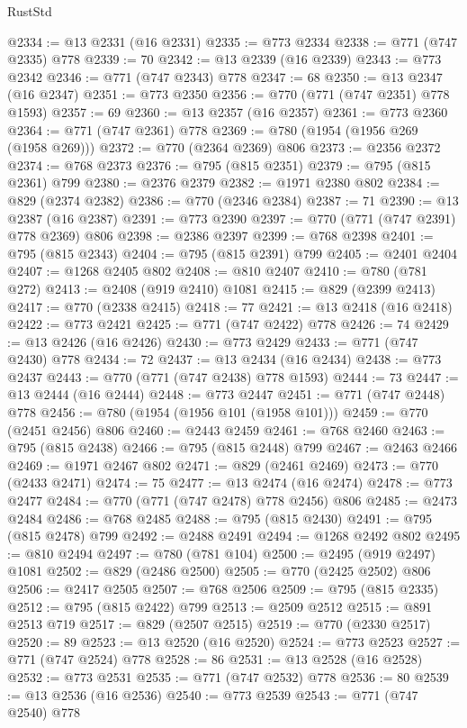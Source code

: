 \begin{lexlean}{RustStd}
\begin{coremodule}
@2334 := @13 @2331 (@16 @2331)
@2335 := @773 @2334
@2338 := @771 (@747 @2335) @778
@2339 := 70
@2342 := @13 @2339 (@16 @2339)
@2343 := @773 @2342
@2346 := @771 (@747 @2343) @778
@2347 := 68
@2350 := @13 @2347 (@16 @2347)
@2351 := @773 @2350
@2356 := @770 (@771 (@747 @2351) @778 @1593)
@2357 := 69
@2360 := @13 @2357 (@16 @2357)
@2361 := @773 @2360
@2364 := @771 (@747 @2361) @778
@2369 := @780 (@1954 (@1956 @269 (@1958 @269)))
@2372 := @770 (@2364 @2369) @806
@2373 := @2356 @2372
@2374 := @768 @2373
@2376 := @795 (@815 @2351)
@2379 := @795 (@815 @2361) @799
@2380 := @2376 @2379
@2382 := @1971 @2380 @802
@2384 := @829 (@2374 @2382)
@2386 := @770 (@2346 @2384)
@2387 := 71
@2390 := @13 @2387 (@16 @2387)
@2391 := @773 @2390
@2397 := @770 (@771 (@747 @2391) @778 @2369) @806
@2398 := @2386 @2397
@2399 := @768 @2398
@2401 := @795 (@815 @2343)
@2404 := @795 (@815 @2391) @799
@2405 := @2401 @2404
@2407 := @1268 @2405 @802
@2408 := @810 @2407
@2410 := @780 (@781 @272)
@2413 := @2408 (@919 @2410) @1081
@2415 := @829 (@2399 @2413)
@2417 := @770 (@2338 @2415)
@2418 := 77
@2421 := @13 @2418 (@16 @2418)
@2422 := @773 @2421
@2425 := @771 (@747 @2422) @778
@2426 := 74
@2429 := @13 @2426 (@16 @2426)
@2430 := @773 @2429
@2433 := @771 (@747 @2430) @778
@2434 := 72
@2437 := @13 @2434 (@16 @2434)
@2438 := @773 @2437
@2443 := @770 (@771 (@747 @2438) @778 @1593)
@2444 := 73
@2447 := @13 @2444 (@16 @2444)
@2448 := @773 @2447
@2451 := @771 (@747 @2448) @778
@2456 := @780 (@1954 (@1956 @101 (@1958 @101)))
@2459 := @770 (@2451 @2456) @806
@2460 := @2443 @2459
@2461 := @768 @2460
@2463 := @795 (@815 @2438)
@2466 := @795 (@815 @2448) @799
@2467 := @2463 @2466
@2469 := @1971 @2467 @802
@2471 := @829 (@2461 @2469)
@2473 := @770 (@2433 @2471)
@2474 := 75
@2477 := @13 @2474 (@16 @2474)
@2478 := @773 @2477
@2484 := @770 (@771 (@747 @2478) @778 @2456) @806
@2485 := @2473 @2484
@2486 := @768 @2485
@2488 := @795 (@815 @2430)
@2491 := @795 (@815 @2478) @799
@2492 := @2488 @2491
@2494 := @1268 @2492 @802
@2495 := @810 @2494
@2497 := @780 (@781 @104)
@2500 := @2495 (@919 @2497) @1081
@2502 := @829 (@2486 @2500)
@2505 := @770 (@2425 @2502) @806
@2506 := @2417 @2505
@2507 := @768 @2506
@2509 := @795 (@815 @2335)
@2512 := @795 (@815 @2422) @799
@2513 := @2509 @2512
@2515 := @891 @2513 @719
@2517 := @829 (@2507 @2515)
@2519 := @770 (@2330 @2517)
@2520 := 89
@2523 := @13 @2520 (@16 @2520)
@2524 := @773 @2523
@2527 := @771 (@747 @2524) @778
@2528 := 86
@2531 := @13 @2528 (@16 @2528)
@2532 := @773 @2531
@2535 := @771 (@747 @2532) @778
@2536 := 80
@2539 := @13 @2536 (@16 @2536)
@2540 := @773 @2539
@2543 := @771 (@747 @2540) @778

\end{coremodule}
\end{lexlean}
